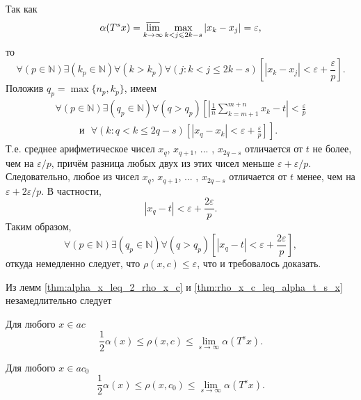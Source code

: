 Так как
\begin{equation}
	\alpha(T^s x) = \varlimsup_{k\to\infty} \max_{k<j\leq 2k-s} |x_k-x_j| = \varepsilon
	,
\end{equation}
то
\begin{equation}
	\forall(p\in\mathbb{N})
	\exists(k_p \in\mathbb{N})\forall(k>k_p)
	\forall(j: k< j \leq 2k-s)
	\left[
		|x_k - x_j|<\varepsilon + \frac{\varepsilon}{p}
	\right]
	.
\end{equation}
Положив $q_p = \max\{n_p, k_p\}$, имеем
\begin{multline}
	\forall(p\in\mathbb{N})
	\exists(q_p \in\mathbb{N})
	\forall(q>q_p)
	\left[
		\left|
			\frac{1}{n}\sum_{k=m+1}^{m+n} x_k
			-t
		\right|
		<\frac{\varepsilon}{p}
		\right.\\ \left. \phantom{\sum_0^0}
		\mbox{~~и~~}
		\forall(k:q<k \leq 2q-s)
		\left[
			|x_q - x_k|<\varepsilon + \frac{\varepsilon}{p}
		\right]
	\right]
	.
\end{multline}
Т.е. среднее арифметическое чисел $x_q$, $x_{q+1}$, ... , $x_{2q-s}$ отличается от $t$
не более, чем на $\varepsilon/p$, причём разница любых двух из этих чисел меньше $\varepsilon + \varepsilon/p$.
Следовательно, любое из чисел $x_q$, $x_{q+1}$, ... , $x_{2q-s}$
отличается от $t$ менее, чем на $\varepsilon + 2\varepsilon/p$.
В частности,
\begin{equation}
	|x_q - t| < \varepsilon + \frac{2\varepsilon}{p}
	.
\end{equation}
Таким образом,
\begin{equation}
	\forall(p\in\mathbb{N})
	\exists(q_p \in\mathbb{N})
	\forall(q>q_p)
	\left[
		|x_q - t| < \varepsilon + \frac{2\varepsilon}{p}
	\right]
	,
\end{equation}
откуда немедленно следует, что $\rho(x,c) \leq \varepsilon$,
что и требовалось доказать.

Из лемм \ref{thm:alpha_x_leq_2_rho_x_c} и \ref{thm:rho_x_c_leq_alpha_t_s_x}
незамедлительно следует
\begin{theorem}
\label{thm:rho_x_c_leq_alpha_t_s_x}
	Для любого $x\in ac$
	\begin{equation}
		\frac{1}{2} \alpha(x) \leq \rho(x,c)\leq \lim_{s\to\infty} \alpha(T^s x)
		.
	\end{equation}
\end{theorem}

\begin{corollary}
	Для любого $x\in ac_0$
	\begin{equation}
		\frac{1}{2} \alpha(x) \leq \rho(x,c_0)\leq \lim_{s\to\infty} \alpha(T^s x)
		.
	\end{equation}
\end{corollary}

